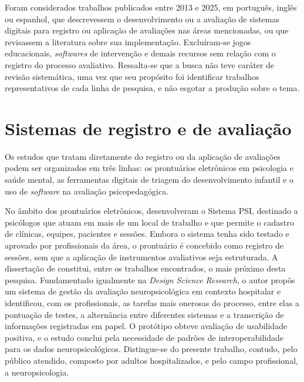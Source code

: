 Foram considerados trabalhos publicados entre 2013 e 2025, em português, inglês ou espanhol, que descrevessem o desenvolvimento ou a avaliação de sistemas digitais para registro ou aplicação de avaliações nas áreas mencionadas, ou que revisassem a literatura sobre sua implementação. Excluíram-se jogos educacionais, \textit{softwares} de intervenção e demais recursos sem relação com o registro do processo avaliativo. Ressalta-se que a busca não teve caráter de revisão sistemática, uma vez que seu propósito foi identificar trabalhos representativos de cada linha de pesquisa, e não esgotar a produção sobre o tema.

\section{Sistemas de registro e de avaliação}\label{sec:estudos_avaliacao}

Os estudos que tratam diretamente do registro ou da aplicação de avaliações podem ser organizados em três linhas: os prontuários eletrônicos em psicologia e saúde mental, as ferramentas digitais de triagem do desenvolvimento infantil e o uso de \textit{software} na avaliação psicopedagógica.

No âmbito dos prontuários eletrônicos,  desenvolveram o Sistema PSI, destinado a psicólogos que atuam em mais de um local de trabalho e que permite o cadastro de clínicas, equipes, pacientes e sessões. Embora o sistema tenha sido testado e aprovado por profissionais da área, o prontuário é concebido como registro de sessões, sem que a aplicação de instrumentos avaliativos seja estruturada. A dissertação de  constitui, entre os trabalhos encontrados, o mais próximo desta pesquisa. Fundamentado igualmente na \textit{Design Science Research}, o autor propôs um sistema de gestão da avaliação neuropsicológica em contexto hospitalar e identificou, com os profissionais, as tarefas mais onerosas do processo, entre elas a pontuação de testes, a alternância entre diferentes sistemas e a transcrição de informações registradas em papel. O protótipo obteve avaliação de usabilidade positiva, e o estudo conclui pela necessidade de padrões de interoperabilidade para os dados neuropsicológicos. Distingue-se do presente trabalho, contudo, pelo público atendido, composto por adultos hospitalizados, e pelo campo profissional, a neuropsicologia.


